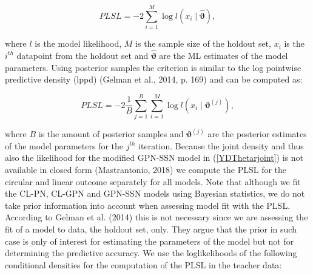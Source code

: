 \documentclass[12pt,]{article}
\begin{document}
\begin{equation}\label{PLSLML}
PLSL = -2 \sum_{i = 1}^{M}\log l(x_i \mid \hat{\boldsymbol{\vartheta}}),\nonumber
\end{equation}

\noindent where \(l\) is the model likelihood, \(M\) is the sample size
of the holdout set, \(x_i\) is the \(i^{th}\) datapoint from the holdout
set and \(\hat{\boldsymbol{\vartheta}}\) are the ML estimates of the
model parameters. Using posterior samples the criterion is similar to
the log pointwise predictive density (lppd) (Gelman et al., 2014, p.
169) and can be computed as:

\begin{equation}\label{PLSLBayes}
PLSL = -2 \frac{1}{B} \sum_{j = 1}^{B}\sum_{i = 1}^{M} \log l(x_i \mid \boldsymbol{\vartheta}^{(j)}),\nonumber
\end{equation}

\noindent where \(B\) is the amount of posterior samples and
\(\boldsymbol{\vartheta}^{(j)}\) are the posterior estimates of the
model parameters for the \(j^{th}\) iteration. Because the joint density
and thus also the likelihood for the modified GPN-SSN model in
(\ref{YDThetarjoint}) is not available in closed form (Mastrantonio,
2018) we compute the PLSL for the circular and linear outcome separately
for all models. Note that although we fit the CL-PN, CL-GPN and GPN-SSN
models using Bayesian statistics, we do not take prior information into
account when assessing model fit with the PLSL. According to Gelman et
al. (2014) this is not necessary since we are assessing the fit of a
model to data, the holdout set, only. They argue that the prior in such
case is only of interest for estimating the parameters of the model but
not for determining the predictive accuracy.\newline
\indent We use the loglikelihoods of the following conditional densities
for the computation of the PLSL in the teacher data:
\end{document}
